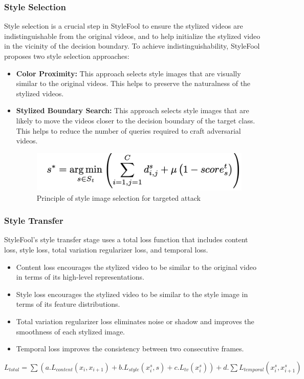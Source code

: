 \subsubsection{Style Selection}
Style selection is a crucial step in StyleFool to ensure the stylized videos are indistinguishable from the original videos, and to help initialize the stylized video in the vicinity of the decision boundary. 
To achieve indistinguishability, StyleFool proposes two style selection approaches:
\begin{itemize}
    \item \textbf{Color Proximity:} This approach selects style images that are visually similar to the original videos. This helps to preserve the naturalness of the stylized videos.
    \item \textbf{Stylized Boundary Search:} This approach selects style images that are likely to move the videos closer to the decision boundary of the target class. This helps to reduce the number of queries required to craft adversarial videos.
    \begin{figure}[!hbt]
    \centering
    \includegraphics[scale=0.4]{img/styleSelection.png}
    \caption{Principle of style image selection for targeted attack}
    \end{figure}
\end{itemize}

\subsubsection{Style Transfer}
StyleFool's style transfer stage uses a total loss function that includes content loss, style loss, total variation regularizer loss, and temporal loss.
\begin{itemize}
    \item Content loss encourages the stylized video to be similar to the original video in terms of its high-level representations.
    \item Style loss encourages the stylized video to be similar to the style image in terms of its feature distributions.
    \item Total variation regularizer loss eliminates noise or shadow and improves the smoothness of each stylized image.
    \item Temporal loss improves the consistency between two consecutive frames.
\end{itemize}
$ L_{total} = \sum (a.L_{content}(x_i, x_{i+1}) + b.L_{style}(x_{i}^{s}, s) + c.L_{tv}(x_{i}^{s})) + d.\sum L_{temporal}(x_{i}^{s}, x_{i+1}^{s})$


